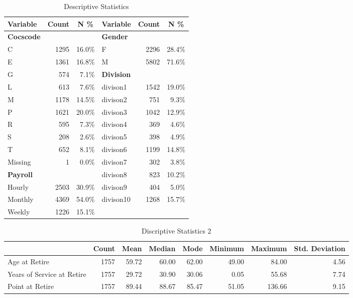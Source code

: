 \documentclass[12pt,letterpaper]{article}
\begin{document}
\begin{table}[htbp]
	\centering
	\scriptsize
	\renewcommand{\arraystretch}{1.5}
	\caption{Descriptive Statistics}
	\begin{tabular}{lrrlrr}
		\toprule
	\textbf{Variable}	& \multicolumn{1}{c}{\textbf{Count}} & \multicolumn{1}{c}{\textbf{N \%}}  &   \textbf{Variable}    & \multicolumn{1}{c}{\textbf{Count}} & \multicolumn{1}{c}{\textbf{N \%}} \\
		\midrule
		\textbf{Cocscode} &       &       & \textbf{Gender} &       &  \\
		C     & 1295  & 16.0\% & F     & 2296  & 28.4\% \\
		E     & 1361  & 16.8\% & M     & 5802  & 71.6\% \\
		G     & 574   & 7.1\% & \textbf{Division} &       &  \\
		L     & 613   & 7.6\% & divison1 & 1542  & 19.0\% \\
		M     & 1178  & 14.5\% & divison2 & 751   & 9.3\% \\
		P     & 1621  & 20.0\% & divison3 & 1042  & 12.9\% \\
		R     & 595   & 7.3\% & divison4 & 369   & 4.6\% \\
		S     & 208   & 2.6\% & divison5 & 398   & 4.9\% \\
		T     & 652   & 8.1\% & divison6 & 1199  & 14.8\% \\
		Missing & 1     & 0.0\% & divison7 & 302   & 3.8\% \\
		\textbf{Payroll} &       &       & divison8 & 823   & 10.2\% \\
		Hourly & 2503  & 30.9\% & divison9 & 404   & 5.0\% \\
		Monthly & 4369  & 54.0\% & divison10 & 1268  & 15.7\% \\
		Weekly & 1226  & 15.1\% &       &       &  \\
		\bottomrule
	\end{tabular}%
	\label{tab:descriptive}%
\end{table}%

\begin{table}[htbp]
	\centering
	\scriptsize
	\caption{Discriptive Statistics 2}
	\begin{tabular}{lrrrrrrr}
		\toprule
		& Count & Mean  & Median & Mode  & Minimum & Maximum & Std. Deviation \\
		\midrule
		\multicolumn{1}{l}{Age at Retire} & 1757  & 59.72 & 60.00 & 62.00 & 49.00 & 84.00 & 4.56 \\
		\multicolumn{1}{l}{Years of Service at Retire} & 1757  & 29.72 & 30.90 & 30.06 & 0.05  & 55.68 & 7.74 \\
		\multicolumn{1}{l}{Point at Retire} & 1757  & 89.44 & 88.67 & 85.47 & 51.05 & 136.66 & 9.15 \\
		\bottomrule
	\end{tabular}%
	\label{tab:descrip2}%
\end{table}%
\end{document}
